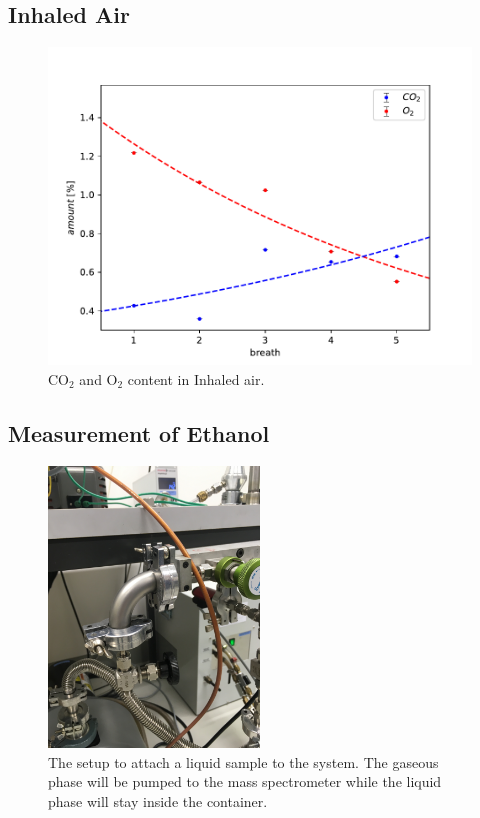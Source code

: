     \subsection{Inhaled Air}
    \begin{figure}
        \centering
        \includegraphics[width=\textwidth]{Report/DataResultsPlots/air.pdf}
        \caption{CO$_2$ and O$_2$ content in Inhaled air.}
        \label{fig:air}
    \end{figure}
    
    
    
    \subsection{Measurement of Ethanol}
    
    \begin{figure}[h!]
    \centering
    \includegraphics[angle=-90, origin=c, width=0.5\textwidth]{Report/pictures/liquids.JPG}
    \caption{The setup to attach a liquid sample to the system. The gaseous phase will be pumped to the mass spectrometer while the liquid phase will stay inside the container.}
    \label{fig:ethanol}
    \end{figure}
    
